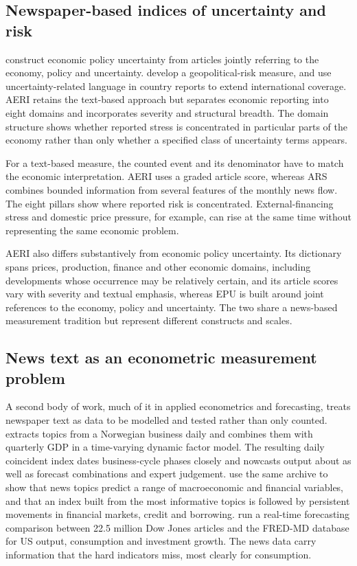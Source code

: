 \documentclass[12pt]{article}
\begin{document}
\subsection{Newspaper-based indices of uncertainty and risk}
\citet{baker2016} construct economic policy uncertainty from articles jointly referring to the economy, policy and uncertainty. \citet{caldara2022} develop a geopolitical-risk measure, and \citet{ahir2022} use uncertainty-related language in country reports to extend international coverage. AERI retains the text-based approach but separates economic reporting into eight domains and incorporates severity and structural breadth. The domain structure shows whether reported stress is concentrated in particular parts of the economy rather than only whether a specified class of uncertainty terms appears.

For a text-based measure, the counted event and its denominator have to match the economic interpretation. AERI uses a graded article score, whereas ARS combines bounded information from several features of the monthly news flow. The eight pillars show where reported risk is concentrated. External-financing stress and domestic price pressure, for example, can rise at the same time without representing the same economic problem.

AERI also differs substantively from economic policy uncertainty. Its dictionary spans prices, production, finance and other economic domains, including developments whose occurrence may be relatively certain, and its article scores vary with severity and textual emphasis, whereas EPU is built around joint references to the economy, policy and uncertainty. The two share a news-based measurement tradition but represent different constructs and scales.
\subsection{News text as an econometric measurement problem}\label{sec:literature_text_econometrics}
A second body of work, much of it in applied econometrics and forecasting, treats newspaper text as data to be modelled and tested rather than only counted. \citet{thorsrud2020} extracts topics from a Norwegian business daily and combines them with quarterly GDP in a time-varying dynamic factor model. The resulting daily coincident index dates business-cycle phases closely and nowcasts output about as well as forecast combinations and expert judgement. \citet{larsen2019} use the same archive to show that news topics predict a range of macroeconomic and financial variables, and that an index built from the most informative topics is followed by persistent movements in financial markets, credit and borrowing. \citet{ellingsen2022} run a real-time forecasting comparison between 22.5 million Dow Jones articles and the FRED-MD database for US output, consumption and investment growth. The news data carry information that the hard indicators miss, most clearly for consumption.
\end{document}
